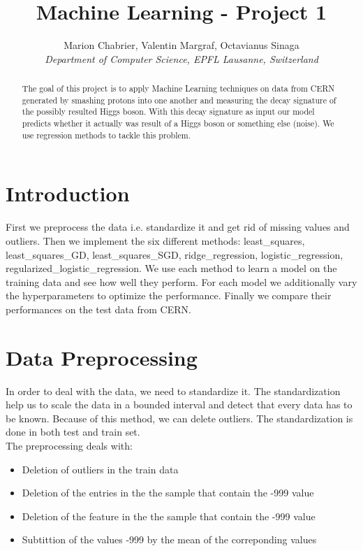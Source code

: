 \documentclass[10pt,conference,compsocconf]{IEEEtran}
\begin{document}
\title{Machine Learning - Project 1}

\author{
  Marion Chabrier, Valentin Margraf, Octavianus Sinaga\\
  \textit{Department of Computer Science, EPFL Lausanne, Switzerland}
}

\maketitle

\begin{abstract}
The goal of this project is to apply Machine Learning techniques on data from CERN generated by smashing protons into one another and measuring the decay signature of the possibly resulted Higgs boson. With this decay signature as input our model predicts whether it actually was result of a Higgs boson or something else (noise). We use regression methods to tackle this problem.
\end{abstract}

\section{Introduction}
First we preprocess the data i.e. standardize it and get rid of missing values and outliers.
Then we implement the six different methods: least\_squares, least\_squares\_GD, least\_squares\_SGD, ridge\_regression, logistic\_regression, regularized\_logistic\_regression. We use each method to learn a model on the training data and see how well they perform. For each model we additionally vary the hyperparameters to optimize the performance. Finally we compare their performances on the test data from CERN.



\section{Data Preprocessing}
\label{sec:prepro}
In order to deal with the data, we need to standardize it. The standardization help us to scale the data in a bounded interval and detect that every data has to be known.
Because of this method, we can delete outliers. The standardization is done in both test and train set.
\\
The preprocessing deals with:
\begin{itemize}
  \item Deletion of outliers in the train data
  \item Deletion of the entries in the the sample that contain the -999 value
  \item Deletion of the feature in the the sample that contain the -999 value
  \item Subtittion of the values -999 by the mean of the correponding values
\end{itemize}
\end{document}
